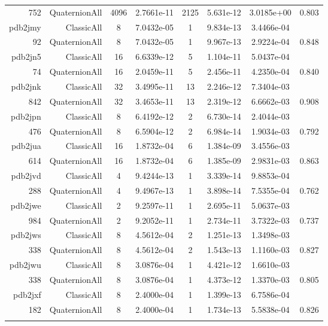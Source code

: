 \begin{xltabular}{\textwidth}{r|rcS[table-format=1.4e+2]cS[table-format=1.3e+2]S[table-format=1.4e+2]S[table-format=-1.3]}
752 & QuaternionAll & 4096 & 2.7661e-11 & 2125 & 5.631e-12 & 3.0185e+00 & 0.803\\  \addlinespace
pdb2jmy & ClassicAll & 8 & 7.0432e-05 & 1 & 9.834e-13 & 3.4466e-04 & \\
92 & QuaternionAll & 8 & 7.0432e-05 & 1 & 9.967e-13 & 2.9224e-04 & 0.848\\  \addlinespace
pdb2jn5 & ClassicAll & 16 & 6.6339e-12 & 5 & 1.104e-11 & 5.0437e-04 & \\
74 & QuaternionAll & 16 & 2.0459e-11 & 5 & 2.456e-11 & 4.2350e-04 & 0.840\\  \addlinespace
pdb2jnk & ClassicAll & 32 & 3.4995e-11 & 13 & 2.246e-12 & 7.3404e-03 & \\
842 & QuaternionAll & 32 & 3.4653e-11 & 13 & 2.319e-12 & 6.6662e-03 & 0.908\\  \addlinespace
pdb2jpn & ClassicAll & 8 & 6.4192e-12 & 2 & 6.730e-14 & 2.4044e-03 & \\
476 & QuaternionAll & 8 & 6.5904e-12 & 2 & 6.984e-14 & 1.9034e-03 & 0.792\\  \addlinespace
pdb2jua & ClassicAll & 16 & 1.8732e-04 & 6 & 1.384e-09 & 3.4556e-03 & \\
614 & QuaternionAll & 16 & 1.8732e-04 & 6 & 1.385e-09 & 2.9831e-03 & 0.863\\  \addlinespace
pdb2jvd & ClassicAll & 4 & 9.4244e-13 & 1 & 3.339e-14 & 9.8853e-04 & \\
288 & QuaternionAll & 4 & 9.4967e-13 & 1 & 3.898e-14 & 7.5355e-04 & 0.762\\  \addlinespace
pdb2jwe & ClassicAll & 2 & 9.2597e-11 & 1 & 2.695e-11 & 5.0637e-03 & \\
984 & QuaternionAll & 2 & 9.2052e-11 & 1 & 2.734e-11 & 3.7322e-03 & 0.737\\  \addlinespace
pdb2jws & ClassicAll & 8 & 4.5612e-04 & 2 & 1.251e-13 & 1.3498e-03 & \\
338 & QuaternionAll & 8 & 4.5612e-04 & 2 & 1.543e-13 & 1.1160e-03 & 0.827\\  \addlinespace
pdb2jwu & ClassicAll & 8 & 3.0876e-04 & 1 & 4.421e-12 & 1.6610e-03 & \\
338 & QuaternionAll & 8 & 3.0876e-04 & 1 & 4.373e-12 & 1.3370e-03 & 0.805\\  \addlinespace
pdb2jxf & ClassicAll & 8 & 2.4000e-04 & 1 & 1.399e-13 & 6.7586e-04 & \\
182 & QuaternionAll & 8 & 2.4000e-04 & 1 & 1.734e-13 & 5.5838e-04 & 0.826\\  \addlinespace

\end{xltabular}
